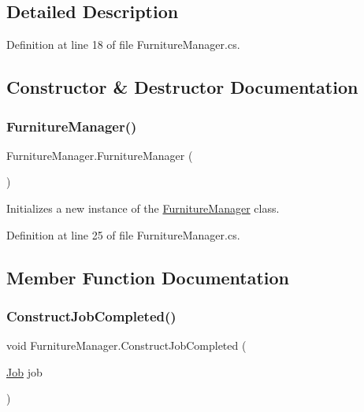 \subsection{Detailed Description}


Definition at line 18 of file Furniture\+Manager.\+cs.



\subsection{Constructor \& Destructor Documentation}
\mbox{\label{class_furniture_manager_a761364a8580e4a11ed7b775a02f91bd8}} 
\subsubsection{\texorpdfstring{Furniture\+Manager()}{FurnitureManager()}}
{\footnotesize\ttfamily Furniture\+Manager.\+Furniture\+Manager (\begin{DoxyParamCaption}{ }\end{DoxyParamCaption})}



Initializes a new instance of the \hyperlink{class_furniture_manager}{Furniture\+Manager} class. 



Definition at line 25 of file Furniture\+Manager.\+cs.



\subsection{Member Function Documentation}
\mbox{\label{class_furniture_manager_a011d3a18ca0bb2d2efc9e865cf65b1a3}} 
\subsubsection{\texorpdfstring{Construct\+Job\+Completed()}{ConstructJobCompleted()}}
{\footnotesize\ttfamily void Furniture\+Manager.\+Construct\+Job\+Completed (\begin{DoxyParamCaption}\item[{\hyperlink{class_job}{Job}}]{job }\end{DoxyParamCaption})}



